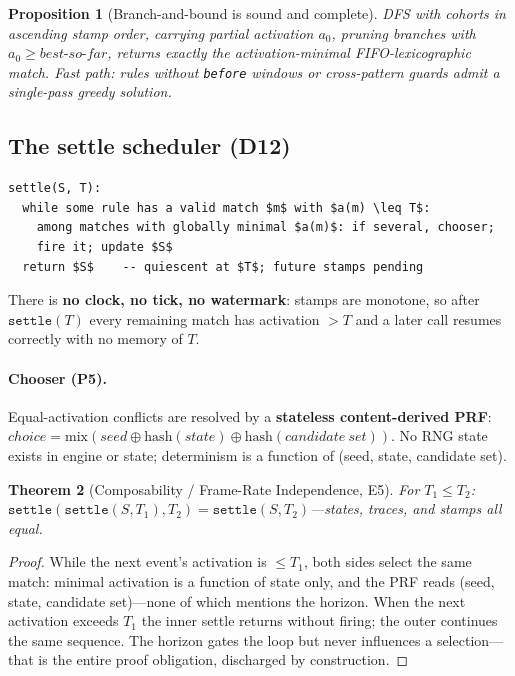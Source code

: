 \documentclass[11pt]{article}
\newtheorem{theorem}{Theorem}[section]
\newtheorem{proposition}[theorem]{Proposition}
\theoremstyle{remark}
\begin{document}
\begin{proposition}[Branch-and-bound is sound and complete]
DFS with cohorts in ascending stamp order, carrying partial activation $a_0$,
pruning branches with $a_0 \geq \mathit{best\text{-}so\text{-}far}$, returns
exactly the activation-minimal FIFO-lexicographic match.  \textit{Fast path}:
rules without \texttt{before} windows or cross-pattern guards admit a single-pass
greedy solution.
\end{proposition}

\subsection{The settle scheduler (D12)}
\label{sec:settle}

\begin{lstlisting}
settle(S, T):
  while some rule has a valid match $m$ with $a(m) \leq T$:
    among matches with globally minimal $a(m)$: if several, chooser;
    fire it; update $S$
  return $S$    -- quiescent at $T$; future stamps pending
\end{lstlisting}

There is \textbf{no clock, no tick, no watermark}: stamps are monotone, so after
$\mathtt{settle}(T)$ every remaining match has activation $> T$ and a later call
resumes correctly with no memory of $T$.

\paragraph{Chooser (P5).} Equal-activation conflicts are resolved by a
\textbf{stateless content-derived PRF}:
$\mathit{choice} = \mathrm{mix}(\mathit{seed} \oplus \mathrm{hash}(\mathit{state}) \oplus
\mathrm{hash}(\mathit{candidate\ set}))$.
No RNG state exists in engine or state; determinism is a function of (seed,
state, candidate set).

\begin{theorem}[Composability / Frame-Rate Independence, E5]
\label{thm:composability}
For $T_1 \leq T_2$:
$\mathtt{settle}(\mathtt{settle}(S, T_1), T_2) = \mathtt{settle}(S, T_2)$---states,
traces, and stamps all equal.
\end{theorem}

\begin{proof}
While the next event's activation is $\leq T_1$, both sides select the same
match: minimal activation is a function of state only, and the PRF reads (seed,
state, candidate set)---none of which mentions the horizon.  When the next
activation exceeds $T_1$ the inner settle returns without firing; the outer
continues the same sequence.  The horizon gates the loop but never influences a
selection---that is the entire proof obligation, discharged by construction.
\end{proof}
\end{document}
